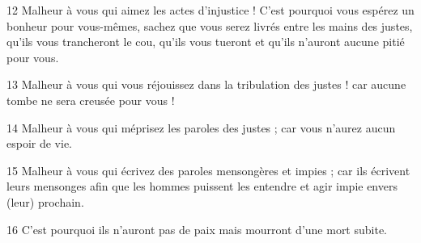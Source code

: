 \par 12 Malheur à vous qui aimez les actes d'injustice ! C'est pourquoi vous espérez un bonheur pour vous-mêmes, sachez que vous serez livrés entre les mains des justes, qu'ils vous trancheront le cou, qu'ils vous tueront et qu'ils n'auront aucune pitié pour vous.
\par 13 Malheur à vous qui vous réjouissez dans la tribulation des justes ! car aucune tombe ne sera creusée pour vous !
\par 14 Malheur à vous qui méprisez les paroles des justes ; car vous n’aurez aucun espoir de vie.
\par 15 Malheur à vous qui écrivez des paroles mensongères et impies ; car ils écrivent leurs mensonges afin que les hommes puissent les entendre et agir impie envers (leur) prochain.
\par 16 C'est pourquoi ils n'auront pas de paix mais mourront d'une mort subite.



